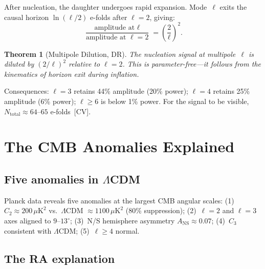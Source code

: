 \documentclass[11pt,a4paper]{article}
\theoremstyle{plain}
\newtheorem{theorem}{Theorem}[section]
\theoremstyle{definition}
\theoremstyle{remark}
\begin{document}
After nucleation, the daughter undergoes rapid expansion.  Mode~$\ell$ exits the
causal horizon $\ln(\ell/2)$ e-folds after $\ell = 2$, giving:
\begin{equation}
\frac{\text{amplitude at }\ell}{\text{amplitude at }\ell = 2} = \left(\frac{2}{\ell}\right)^{\!2}.
\label{eq:dilution}
\end{equation}

\begin{theorem}[Multipole Dilution, DR]\label{thm:dilution}
The nucleation signal at multipole~$\ell$ is diluted by $(2/\ell)^2$ relative to
$\ell = 2$.  This is parameter-free---it follows from the kinematics of horizon
exit during inflation.
\end{theorem}

Consequences: $\ell = 3$ retains 44\% amplitude (20\% power); $\ell = 4$ retains
25\% amplitude (6\% power); $\ell \geq 6$ is below 1\% power.  For the signal to
be visible, $N_{\mathrm{total}} \approx 64$--$65$ e-folds~[CV].

\section{The CMB Anomalies Explained}\label{sec:cmb}

\subsection{Five anomalies in $\Lambda$CDM}\label{sec:anomalies}

Planck data reveals five anomalies at the largest CMB angular scales:
(1)~$C_2 \approx 200\,\mu\mathrm{K}^2$ vs.\ $\Lambda$CDM $\approx 1100\,\mu\mathrm{K}^2$
(80\% suppression); (2)~$\ell = 2$ and $\ell = 3$ axes aligned to $9$--$13^\circ$;
(3)~N/S hemisphere asymmetry $A_{\mathrm{NS}} \approx 0.07$; (4)~$C_3$ consistent
with $\Lambda$CDM; (5)~$\ell \geq 4$ normal.

\subsection{The RA explanation}\label{sec:explanation}
\end{document}
